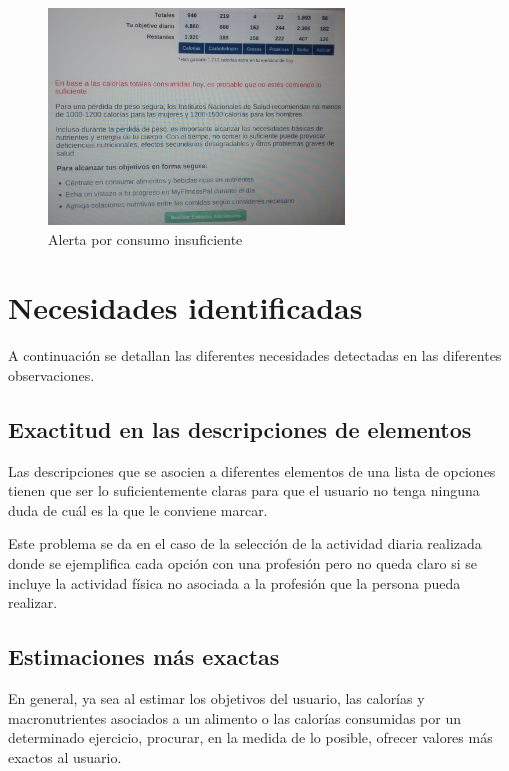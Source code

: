 \documentclass[a4paper]{article}
\begin{document}
			\begin{figure}[!h]
				\centering
				\includegraphics[width=0.7\textwidth]{./figuras/andoni5.jpg}
				\caption{Alerta por consumo insuficiente}
			\end{figure}
		\FloatBarrier
		

\section{Necesidades identificadas}

A continuación se detallan las diferentes necesidades detectadas en las diferentes observaciones.

	\subsection{Exactitud en las descripciones de elementos}
	
	Las descripciones que se asocien a diferentes elementos de una lista de opciones tienen que ser lo suficientemente claras para que el usuario no tenga ninguna duda de cuál es la que le conviene marcar.
	
	Este problema se da en el caso de la selección de la actividad diaria realizada donde se ejemplifica cada opción con una profesión pero no queda claro si se incluye la actividad física no asociada a la profesión que la persona pueda realizar.
	
	\subsection{Estimaciones más exactas}
	
	En general, ya sea al estimar los objetivos del usuario, las calorías y macronutrientes asociados a un alimento o las calorías consumidas por un determinado ejercicio, procurar, en la medida de lo posible, ofrecer valores más exactos al usuario.
	
\end{document}
